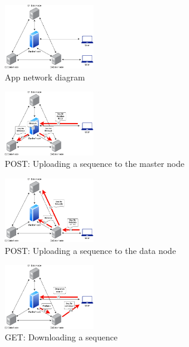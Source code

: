 \documentclass{article}
\begin{document}
\begin{figure}[h]
\caption{App network diagram}
\centering
\includegraphics[width=0.35\textwidth]{images/thesis1.png} 
\end{figure}


\begin{figure}[h]
\caption{POST: Uploading a sequence to the master node}
\centering
\includegraphics[width=0.35\textwidth]{images/thesis3.png} 
\end{figure}

\begin{figure}[h]
\caption{POST: Uploading a sequence to the data node}
\centering
\includegraphics[width=0.35\textwidth]{images/thesis2.png} 
\end{figure}

\begin{figure}[h]
\caption{GET: Downloading a sequence}
\centering
\includegraphics[width=0.35\textwidth]{images/thesis4.png} 
\end{figure}
\end{document}
